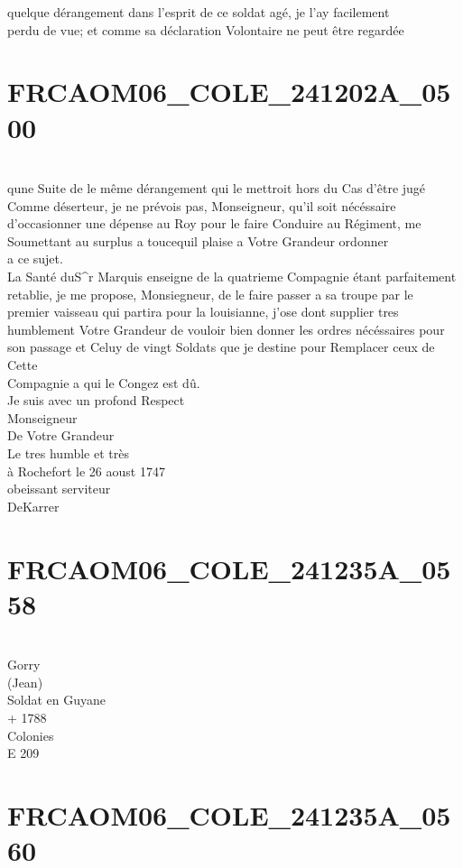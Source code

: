 \documentclass{article}
\begin{document}
\begin{pages}
quelque dérangement dans l'esprit de ce soldat agé, je l'ay facilement\\
perdu de vue; et comme sa déclaration Volontaire ne peut être regardée
\pend
\endnumbering\beginnumbering\section{FRCAOM06\_COLE\_241202A\_0500}\pstart
\\
qune Suite de le même dérangement qui le mettroit hors du Cas d'être jugé\\
Comme déserteur, je ne prévois pas, Monseigneur, qu'il soit nécéssaire\\
d'occasionner une dépense au Roy pour le faire Conduire au Régiment, me\\
Soumettant au surplus a toucequil plaise a Votre Grandeur ordonner\\
a ce sujet.\\
La Santé duS\^{}r Marquis enseigne de la quatrieme Compagnie étant parfaitement\\
retablie, je me propose, Monsiegneur, de le faire passer a sa troupe par le\\
premier vaisseau qui partira pour la louisianne, j'ose dont supplier tres\\
humblement Votre Grandeur de vouloir bien donner les ordres nécéssaires pour\\
son passage et Celuy de vingt Soldats que je destine pour Remplacer ceux de Cette\\
Compagnie a qui le Congez est dû.\\
Je suis avec un profond Respect\\
Monseigneur\\
De Votre Grandeur\\
Le tres humble et très\\
à Rochefort le 26 aoust 1747\\
obeissant serviteur\\
DeKarrer
\pend
\endnumbering\beginnumbering\section{FRCAOM06\_COLE\_241235A\_0558}\pstart
\\
Gorry\\
(Jean)\\
Soldat en Guyane\\
+ 1788\\
Colonies\\
E 209
\pend
\endnumbering\beginnumbering\section{FRCAOM06\_COLE\_241235A\_0560}

\end{pages}
\end{document}
